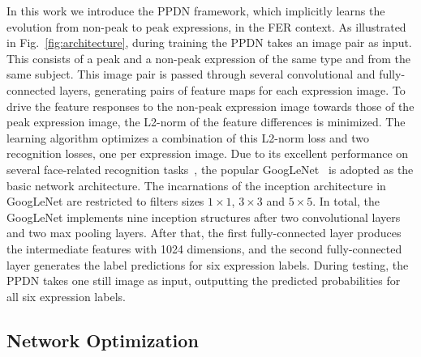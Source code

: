 \documentclass[runningheads]{llncs}
\begin{document}
In this work we introduce the PPDN framework, which implicitly learns 
the evolution from non-peak to peak expressions, in
the FER context. As illustrated in 
Fig.~\ref{fig:architecture}, during training the PPDN takes an image pair as 
input. This consists of a peak and a non-peak expression of the same 
type and from the same subject. This image pair is passed through several 
convolutional and fully-connected layers, generating pairs of feature 
maps for each expression image. To drive the feature responses to the 
non-peak expression image towards those of the peak expression image, the 
L2-norm of the feature differences is minimized. 
The learning algorithm optimizes a combination of this L2-norm loss
and two recognition losses, one per expression image. 
Due to its excellent performance on several face-related recognition 
tasks~\cite{schroff2015facenet,sun2015deepid3}, the popular 
GoogLeNet~\cite{szegedy2015going} is adopted as the basic 
network architecture. The incarnations of the inception architecture in 
GoogLeNet are restricted to filters sizes $1 \times 1$, $3 \times 3$ and 
$5 \times 5$. In total, the GoogLeNet implements nine inception structures 
after two convolutional layers and two max pooling layers. After that, the 
first fully-connected layer produces the intermediate features with 1024 
dimensions, and the second fully-connected layer generates the label 
predictions for six expression labels. During testing, the PPDN takes one 
still image as input, outputting the predicted probabilities for all six 
expression labels. 



\subsection{Network Optimization}
\end{document}
